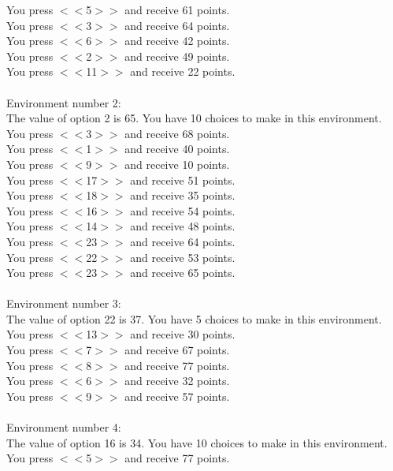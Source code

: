 \documentclass[pdflatex,sn-nature]{sn-jnl}%
\theoremstyle{thmstyleone}%
\theoremstyle{thmstyletwo}%
\theoremstyle{thmstylethree}%
\begin{document}
You press $<<$5$>>$ and receive 61 points. $~$\\ 
You press $<<$3$>>$ and receive 64 points. $~$\\ 
You press $<<$6$>>$ and receive 42 points. $~$\\ 
You press $<<$2$>>$ and receive 49 points. $~$\\ 
You press $<<$11$>>$ and receive 22 points. $~$\\ 
 $~$\\ 
Environment number 2: $~$\\ 
The value of option 2 is 65. You have 10 choices to make in this environment. $~$\\ 
You press $<<$3$>>$ and receive 68 points. $~$\\ 
You press $<<$1$>>$ and receive 40 points. $~$\\ 
You press $<<$9$>>$ and receive 10 points. $~$\\ 
You press $<<$17$>>$ and receive 51 points. $~$\\ 
You press $<<$18$>>$ and receive 35 points. $~$\\ 
You press $<<$16$>>$ and receive 54 points. $~$\\ 
You press $<<$14$>>$ and receive 48 points. $~$\\ 
You press $<<$23$>>$ and receive 64 points. $~$\\ 
You press $<<$22$>>$ and receive 53 points. $~$\\ 
You press $<<$23$>>$ and receive 65 points. $~$\\ 
 $~$\\ 
Environment number 3: $~$\\ 
The value of option 22 is 37. You have 5 choices to make in this environment. $~$\\ 
You press $<<$13$>>$ and receive 30 points. $~$\\ 
You press $<<$7$>>$ and receive 67 points. $~$\\ 
You press $<<$8$>>$ and receive 77 points. $~$\\ 
You press $<<$6$>>$ and receive 32 points. $~$\\ 
You press $<<$9$>>$ and receive 57 points. $~$\\ 
 $~$\\ 
Environment number 4: $~$\\ 
The value of option 16 is 34. You have 10 choices to make in this environment. $~$\\ 
You press $<<$5$>>$ and receive 77 points. $~$\\ 
\end{document}
